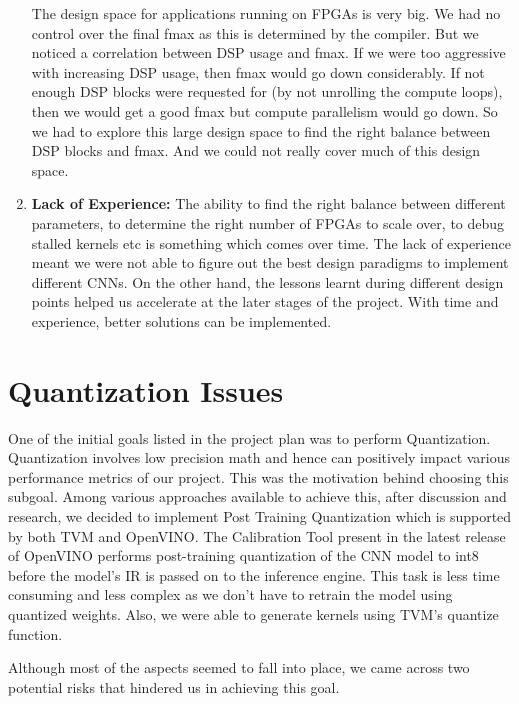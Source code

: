 \begin{enumerate}
The design space for applications running on FPGAs is very big. We had no control over the final fmax as this is determined by the compiler. But we noticed a correlation between DSP usage and fmax. If we were too aggressive with increasing DSP usage, then fmax would go down considerably. If not enough DSP blocks were requested for (by not unrolling the compute loops), then we would get a good fmax but compute parallelism would go down. So we had to explore this large design space to find the right balance between DSP blocks and fmax. And we could not really cover much of this design space.


\item\textbf{Lack of Experience: }
The ability to find the right balance between different parameters, to determine the right number of FPGAs to scale over, to debug  stalled kernels etc is something which comes over time. The lack of experience meant we were not able to figure out the best design paradigms to implement different CNNs. On the other hand, the lessons learnt during different design points  helped us accelerate at the later stages of the project. With time and experience, better solutions can be implemented.

\end{enumerate}


\section{Quantization Issues }
One of the initial goals listed in the project plan was to perform Quantization. Quantization involves low precision math and hence can positively impact various performance metrics of our project. This was the motivation behind choosing this subgoal. Among various approaches available to achieve this, after discussion and research, we decided to implement Post Training Quantization which is supported by both TVM and OpenVINO. The Calibration Tool present in the latest release of OpenVINO performs post-training quantization of the CNN model to int8 before the model’s IR is passed on to the inference engine. This task is less time consuming and less complex as we don’t have to retrain the model using quantized weights. Also, we were able to generate kernels using TVM’s quantize function. 

Although most of the aspects seemed to fall into place, we came across two potential risks that hindered us in achieving this goal. 
		
